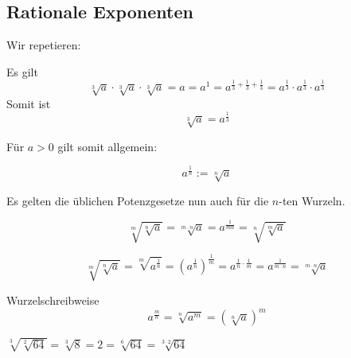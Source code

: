 \newpage


\subsection{Rationale Exponenten}

Wir repetieren:



\begin{beispiel}{}{}
Es gilt
$$\sqrt[3]{a} \cdot{}\sqrt[3]{a} \cdot{}\sqrt[3]{a} = a = a^1 =
a^{\frac13 +\frac13 +\frac13} = a^\frac13 \cdot{} a^\frac13 \cdot
a^\frac13$$
Somit ist
$$\sqrt[3]{a} = a^\frac13$$
\end{beispiel}


Für $a > 0$ gilt somit allgemein:

\begin{definition}{}{}
  $$a^{\frac{1}{n}} := \sqrt[n]{a}$$
\end{definition}


Es gelten die üblichen Potenzgesetze nun auch für die $n$-ten
Wurzeln.


\begin{gesetz}{}{}
  $$\sqrt[m]{\sqrt[n]{a}} = \sqrt[m\cdot n]{a}=a^\frac1{mn} = \sqrt[n]{\sqrt[m]{a}}$$
\end{gesetz}


$$\sqrt[m]{\sqrt[n]{a}} =
\sqrt[m]{a^\frac{1}{n}}
= (a^{\frac{1}{n}})^{\frac{1}{m}} =
a^{\frac{1}{n}\cdot\frac{1}{m}} = a^{\frac{1}{m\cdot n}} =
\sqrt[m\cdot n]{a}$$


\begin{gesetz}{Wurzelschreibweise}{}
$$a^\frac{m}n = \sqrt[n]{a^m} = \left(\sqrt[n]{a}\right)^m$$
\end{gesetz}
\newpage



\begin{beispiel}{}{}
$\sqrt[3]{\sqrt[2]{64}} =
    \sqrt[3]{8} = 2 = \sqrt[6]{64} = \sqrt[3\cdot2]{64}$
\end{beispiel}


